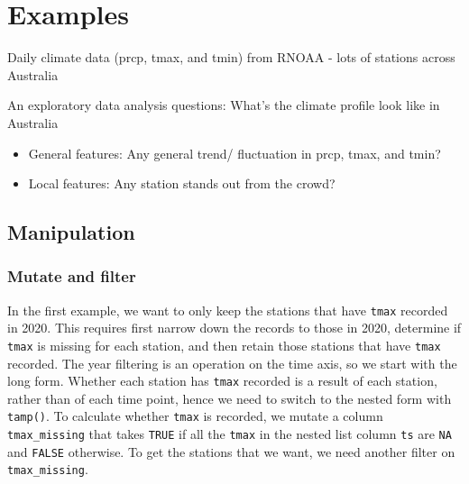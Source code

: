 \documentclass[
]{jss}
\providecommand{\tightlist}{%
  \setlength{\itemsep}{0pt}\setlength{\parskip}{0pt}}
\begin{document}
\newpage

\hypertarget{examples}{%
\section{Examples}\label{examples}}

Daily climate data (prcp, tmax, and tmin) from RNOAA - lots of stations
across Australia

An exploratory data analysis questions: What's the climate profile look
like in Australia

\begin{itemize}
\tightlist
\item
  General features: Any general trend/ fluctuation in prcp, tmax, and
  tmin?
\item
  Local features: Any station stands out from the crowd?
\end{itemize}

\hypertarget{manipulation}{%
\subsection{Manipulation}\label{manipulation}}

\hypertarget{mutate-and-filter}{%
\subsubsection{Mutate and filter}\label{mutate-and-filter}}

In the first example, we want to only keep the stations that have
\texttt{tmax} recorded in 2020. This requires first narrow down the
records to those in 2020, determine if \texttt{tmax} is missing for each
station, and then retain those stations that have \texttt{tmax}
recorded. The year filtering is an operation on the time axis, so we
start with the long form. Whether each station has \texttt{tmax}
recorded is a result of each station, rather than of each time point,
hence we need to switch to the nested form with \texttt{tamp()}. To
calculate whether \texttt{tmax} is recorded, we mutate a column
\texttt{tmax\_missing} that takes \texttt{TRUE} if all the \texttt{tmax}
in the nested list column \texttt{ts} are \texttt{NA} and \texttt{FALSE}
otherwise. To get the stations that we want, we need another filter on
\texttt{tmax\_missing}.
\end{document}
